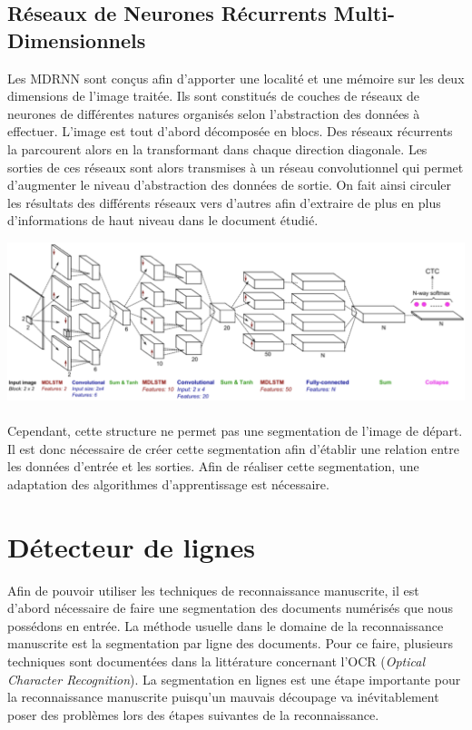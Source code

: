 \subsection{Réseaux de Neurones Récurrents Multi-Dimensionnels}

Les MDRNN sont conçus afin d'apporter une localité et une mémoire sur les deux dimensions de l'image traitée.
Ils sont constitués de couches de réseaux de neurones de différentes natures organisés selon l'abstraction des
données à effectuer. L'image est tout d'abord décomposée en blocs. Des réseaux récurrents la parcourent alors
en la transformant dans chaque direction diagonale. Les sorties de ces réseaux sont alors transmises à un
réseau convolutionnel qui permet d'augmenter le niveau d'abstraction des données de sortie. On fait ainsi
circuler les résultats des différents réseaux vers d’autres afin d’extraire de plus en plus d’informations
de haut niveau dans le document étudié.

\begin{mdframed}[frametitle={Schéma de structure d'un MDRNN}, innerbottommargin=10]
\begin{center}
\includegraphics[width=0.6\linewidth]{mdrnn.png}
\end{center}
\end{mdframed}

\paragraph{}
Cependant, cette structure ne permet pas une segmentation de l'image de départ. Il est donc nécessaire de créer
cette segmentation afin d'établir une relation entre les données d'entrée et les sorties. Afin de réaliser cette
segmentation, une adaptation des algorithmes d'apprentissage est nécessaire.

\section{Détecteur de lignes}

Afin de pouvoir utiliser les techniques de reconnaissance manuscrite, il est d'abord nécessaire
de faire une segmentation des documents numérisés que nous possédons en entrée. La méthode
usuelle dans le domaine de la reconnaissance manuscrite est la segmentation par ligne des documents.
Pour ce faire, plusieurs techniques sont documentées dans la littérature concernant l'OCR
(\textit{Optical Character Recognition}). La segmentation en lignes est une étape importante pour
la reconnaissance manuscrite puisqu'un mauvais découpage va inévitablement poser des problèmes
lors des étapes suivantes de la reconnaissance.

